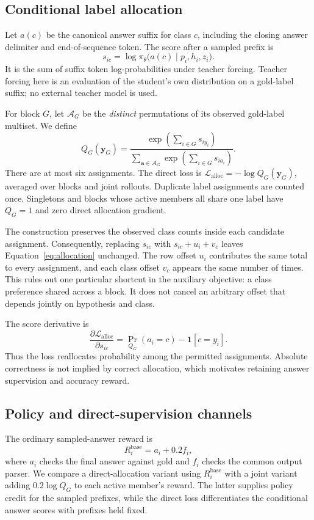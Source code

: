 \documentclass[11pt]{article}
\begin{document}
\subsection{Conditional label allocation}
Let $a(c)$ be the canonical answer suffix for class $c$, including the closing answer delimiter and end-of-sequence token. The score after a sampled prefix is
\begin{equation}
 s_{ic}=\log\pi_\theta\bigl(a(c)\mid p_i,h_i,z_i\bigr).
\end{equation}
It is the sum of suffix token log-probabilities under teacher forcing. Teacher forcing here is an evaluation of the student's own distribution on a gold-label suffix; no external teacher model is used.

For block $G$, let $\mathcal A_G$ be the \emph{distinct} permutations of its observed gold-label multiset. We define
\begin{equation}
 Q_G(\mathbf y_G)=
 \frac{\exp\!\left(\sum_{i\in G}s_{i y_i}\right)}
 {\sum_{\mathbf a\in\mathcal A_G}\exp\!\left(\sum_{i\in G}s_{i a_i}\right)}.
 \label{eq:allocation}
\end{equation}
There are at most six assignments. The direct loss is $\mathcal L_{\mathrm{alloc}}=-\log Q_G(\mathbf y_G)$, averaged over blocks and joint rollouts. Duplicate label assignments are counted once. Singletons and blocks whose active members all share one label have $Q_G=1$ and zero direct allocation gradient.

The construction preserves the observed class counts inside each candidate assignment. Consequently, replacing $s_{ic}$ with $s_{ic}+u_i+v_c$ leaves Equation~\ref{eq:allocation} unchanged. The row offset $u_i$ contributes the same total to every assignment, and each class offset $v_c$ appears the same number of times. This rules out one particular shortcut in the auxiliary objective: a class preference shared across a block. It does not cancel an arbitrary offset that depends jointly on hypothesis and class.

The score derivative is
\begin{equation}
 \frac{\partial\mathcal L_{\mathrm{alloc}}}{\partial s_{ic}}
 =\Pr_{Q_G}(a_i=c)-\mathbf{1}[c=y_i].
 \label{eq:gradient}
\end{equation}
Thus the loss reallocates probability among the permitted assignments. Absolute correctness is not implied by correct allocation, which motivates retaining answer supervision and accuracy reward.

\subsection{Policy and direct-supervision channels}
The ordinary sampled-answer reward is
\begin{equation}
 R_i^{\mathrm{base}}=a_i+0.2f_i,
\end{equation}
where $a_i$ checks the final answer against gold and $f_i$ checks the common output parser. We compare a direct-allocation variant using $R_i^{\mathrm{base}}$ with a joint variant adding $0.2\log Q_G$ to each active member's reward. The latter supplies policy credit for the sampled prefixes, while the direct loss differentiates the conditional answer scores with prefixes held fixed.
\end{document}
